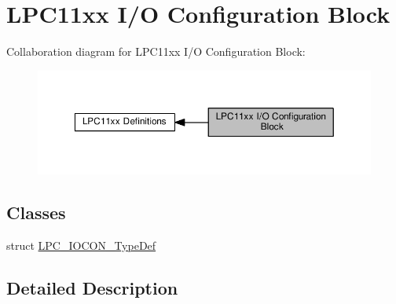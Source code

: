 \hypertarget{group___l_p_c11xx___i_o_c_o_n}{}\section{L\+P\+C11xx I/O Configuration Block}
\label{group___l_p_c11xx___i_o_c_o_n}
Collaboration diagram for L\+P\+C11xx I/O Configuration Block\+:\nopagebreak
\begin{figure}[H]
\begin{center}
\leavevmode
\includegraphics[width=350pt]{group___l_p_c11xx___i_o_c_o_n}
\end{center}
\end{figure}
\subsection*{Classes}
\begin{DoxyCompactItemize}
\item 
struct \hyperlink{struct_l_p_c___i_o_c_o_n___type_def}{L\+P\+C\+\_\+\+I\+O\+C\+O\+N\+\_\+\+Type\+Def}
\end{DoxyCompactItemize}


\subsection{Detailed Description}
